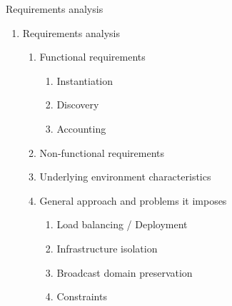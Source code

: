 \documentclass{beamer}
\begin{document}
\setcounter{enumi_chapter}{\value{enumi}}


\begin{frame}{Requirements analysis}

	\begin{enumerate}
		\setcounter{enumi}{\value{enumi_chapter}}

		\item Requirements analysis

			\begin{enumerate}

				\item Functional requirements

					\begin{enumerate}
						\item Instantiation
						\item Discovery
						\item Accounting
					\end{enumerate}

					\pause
			
			 \item Non-functional requirements \pause

			 \item Underlying environment characteristics \pause
		 
			 \item General approach and problems it imposes

			 	\begin{enumerate}
					\item Load balancing / Deployment
					\item Infrastructure isolation
					\item Broadcast domain preservation
					\item Constraints
				\end{enumerate}
		 
			\end{enumerate}

	\end{enumerate}

\end{frame}

\setcounter{enumi_chapter}{\value{enumi}}
\end{document}
